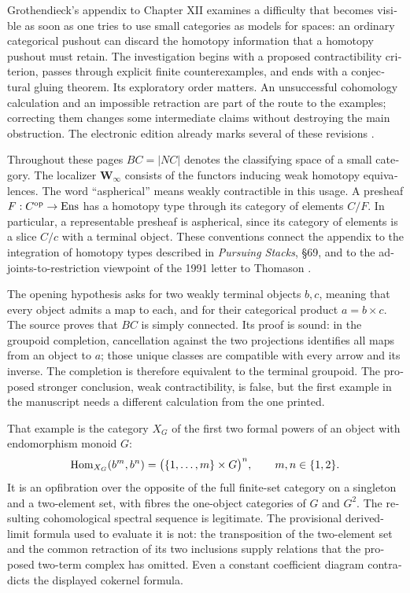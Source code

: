 \begin{otherlanguage}{english}
Grothendieck's appendix to Chapter XII examines a difficulty that becomes visible as soon as one tries to use small categories as models for spaces: an ordinary categorical pushout can discard the homotopy information that a homotopy pushout must retain. The investigation begins with a proposed contractibility criterion, passes through explicit finite counterexamples, and ends with a conjectural gluing theorem. Its exploratory order matters. An unsuccessful cohomology calculation and an impossible retraction are part of the route to the examples; correcting them changes some intermediate claims without destroying the main obstruction. The electronic edition already marks several of these revisions \citep{Grothendieck1990XIIapp}.

Throughout these pages \(BC=|NC|\) denotes the classifying space of a small category. The localizer \(\mathbf W_\infty\) consists of the functors inducing weak homotopy equivalences. The word ``aspherical'' means weakly contractible in this usage. A presheaf \(F:C^{\mathrm{op}}\to\mathrm{Ens}\) has a homotopy type through its category of elements \(C/F\). In particular, a representable presheaf is aspherical, since its category of elements is a slice \(C/c\) with a terminal object. These conventions connect the appendix to the integration of homotopy types described in \emph{Pursuing Stacks}, \S69, and to the adjoints-to-restriction viewpoint of the 1991 letter to Thomason \citep{Grothendieck1983,Grothendieck1991Letter}.

The opening hypothesis asks for two weakly terminal objects \(b,c\), meaning that every object admits a map to each, and for their categorical product \(a=b\times c\). The source proves that \(BC\) is simply connected. Its proof is sound: in the groupoid completion, cancellation against the two projections identifies all maps from an object to \(a\); those unique classes are compatible with every arrow and its inverse. The completion is therefore equivalent to the terminal groupoid. The proposed stronger conclusion, weak contractibility, is false, but the first example in the manuscript needs a different calculation from the one printed.

That example is the category \(X_G\) of the first two formal powers of an object with endomorphism monoid \(G\):
\[
 \mathrm{Hom}_{X_G}(b^m,b^n)=\bigl(\{1,\ldots,m\}\times G\bigr)^n,
 \qquad m,n\in\{1,2\}.
\]
It is an opfibration over the opposite of the full finite-set category on a singleton and a two-element set, with fibres the one-object categories of \(G\) and \(G^2\). The resulting cohomological spectral sequence is legitimate. The provisional derived-limit formula used to evaluate it is not: the transposition of the two-element set and the common retraction of its two inclusions supply relations that the proposed two-term complex has omitted. Even a constant coefficient diagram contradicts the displayed cokernel formula.


\end{otherlanguage}
